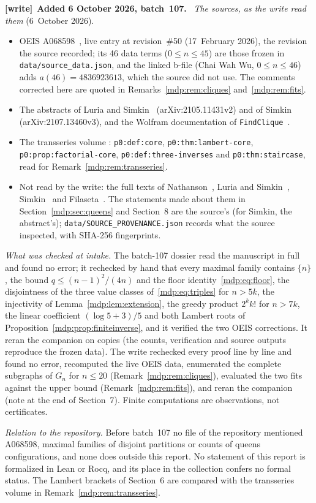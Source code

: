 \documentclass[11pt,letterpaper]{article}
\numberwithin{equation}{section}
\theoremstyle{remark}\newtheorem{remark}[theorem]{Remark}
\newcommand{\file}[1]{\nolinkurl{#1}}
\newenvironment{writenote}[1][]{\par\smallskip\begingroup\small
 \noindent\textbf{[write]}\if\relax\detokenize{#1}\relax\else~\textbf{#1.}\fi\ }%
 {\par\endgroup\smallskip}
\begin{document}
\begin{writenote}[Added 6 October 2026, batch~107]
\emph{The sources, as the write read them} (6~October 2026).
\begin{itemize}\raggedright
\item OEIS A068598~\cite{oeis}, live entry at revision~\#50 (17~February
 2026), the revision the source recorded; its 46 data terms ($0\le n\le45$)
 are those frozen in \file{data/source_data.json}, and the linked b-file
 (Chai Wah Wu, $0\le n\le46$) adds $a(46)=4836923613$, which the source did
 not use. The comments corrected here are quoted in
 Remarks~\ref{mdp:rem:cliques} and~\ref{mdp:rem:fits}.
\item The abstracts of Luria and Simkin~\cite{queens} (arXiv:2105.11431v2)
 and of Simkin~\cite{simkin} (arXiv:2107.13460v3), and the
 Wolfram documentation of \texttt{FindClique}~\cite{findclique}.
\item The transseries volume
 :
 \file{p0:def:core}, \file{p0:thm:lambert-core},
 \file{p0:prop:factorial-core}, \file{p0:def:three-inverses} and
 \file{p0:thm:staircase}, read for Remark~\ref{mdp:rem:transseries}.
\item Not read by the write: the full texts of Nathanson~\cite{nathanson},
 Luria and Simkin~\cite{queens}, Simkin~\cite{simkin} and
 Filaseta~\cite{filaseta}. The statements made about them in
 Section~\ref{mdp:sec:queens} and Section~8 are the source's (for
 Simkin, the abstract's); \file{data/SOURCE_PROVENANCE.json} records what
 the source inspected, with SHA-256 fingerprints.
\end{itemize}

\emph{What was checked at intake.} The batch-107 dossier read the manuscript
in full and found no error; it rechecked by hand that every maximal family
contains $\{n\}$, the bound $q\le(n-1)^2/(4n)$ and the floor
identity~\eqref{mdp:eq:floor}, the disjointness of the three value classes
of~\eqref{mdp:eq:triples} for $n>5k$, the injectivity of
Lemma~\ref{mdp:lem:extension}, the greedy product $2^kk!$ for $n>7k$, the
linear coefficient $(\log5+3)/5$ and both Lambert roots of
Proposition~\ref{mdp:prop:finiteinverse}, and it verified the two OEIS
corrections. It reran the companion on copies (the counts, verification and
source outputs reproduce the frozen data). The write rechecked every proof
line by line and found no error, recomputed the live OEIS data, enumerated the
complete subgraphs of $G_n$ for $n\le20$ (Remark~\ref{mdp:rem:cliques}),
evaluated the two fits against the upper bound (Remark~\ref{mdp:rem:fits}),
and reran the companion (note at the end of Section~7). Finite computations
are observations, not certificates.

\emph{Relation to the repository.} Before batch~107 no file of the
repository mentioned A068598, maximal families of disjoint partitions or
counts of queens configurations, and none does outside this report. No
statement of this report is formalized in Lean or Rocq, and its place in
the collection confers no formal status. The Lambert brackets of
Section~6 are compared with the transseries volume in
Remark~\ref{mdp:rem:transseries}.
\end{writenote}
\end{document}

